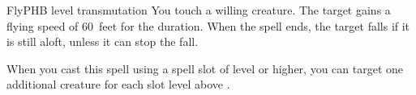 \begin{spell}{Fly}{PHB}{ level transmutation}
{
}
You touch a willing creature. The target gains a flying
speed of 60~feet for the duration. When the spell ends,
the target falls if it is still aloft, unless it can stop
the fall.

 When you cast this spell using
a spell slot of  level or higher, you can target one
additional creature for each slot level above .
\end{spell}